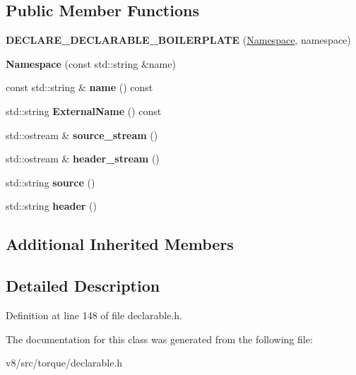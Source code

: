 \subsection*{Public Member Functions}
\begin{DoxyCompactItemize}
\item 
\mbox{\label{classv8_1_1internal_1_1torque_1_1Namespace_a779356a27c78767c56d08786051d63c0}} 
{\bfseries D\+E\+C\+L\+A\+R\+E\+\_\+\+D\+E\+C\+L\+A\+R\+A\+B\+L\+E\+\_\+\+B\+O\+I\+L\+E\+R\+P\+L\+A\+TE} (\mbox{\hyperlink{classv8_1_1internal_1_1torque_1_1Namespace}{Namespace}}, namespace)
\item 
\mbox{\label{classv8_1_1internal_1_1torque_1_1Namespace_a88b1bd006459e0ac10c8cf0b4e0be9f9}} 
{\bfseries Namespace} (const std\+::string \&name)
\item 
\mbox{\label{classv8_1_1internal_1_1torque_1_1Namespace_a9047d3077f8efe8fb29309c5e8e23298}} 
const std\+::string \& {\bfseries name} () const
\item 
\mbox{\label{classv8_1_1internal_1_1torque_1_1Namespace_aca352b8e9525b062fcbc11c946c22667}} 
std\+::string {\bfseries External\+Name} () const
\item 
\mbox{\label{classv8_1_1internal_1_1torque_1_1Namespace_a51300a3bd1e8bb7fb079a8374ba866b5}} 
std\+::ostream \& {\bfseries source\+\_\+stream} ()
\item 
\mbox{\label{classv8_1_1internal_1_1torque_1_1Namespace_a42191c80289eeb26b0d356d300bdd895}} 
std\+::ostream \& {\bfseries header\+\_\+stream} ()
\item 
\mbox{\label{classv8_1_1internal_1_1torque_1_1Namespace_ad2fd678f74291087c05ebcd3975bac3f}} 
std\+::string {\bfseries source} ()
\item 
\mbox{\label{classv8_1_1internal_1_1torque_1_1Namespace_afcf128e5998f08177c40bc1fe88d1ac4}} 
std\+::string {\bfseries header} ()
\end{DoxyCompactItemize}
\subsection*{Additional Inherited Members}


\subsection{Detailed Description}


Definition at line 148 of file declarable.\+h.



The documentation for this class was generated from the following file\+:\begin{DoxyCompactItemize}
\item 
v8/src/torque/declarable.\+h\end{DoxyCompactItemize}
